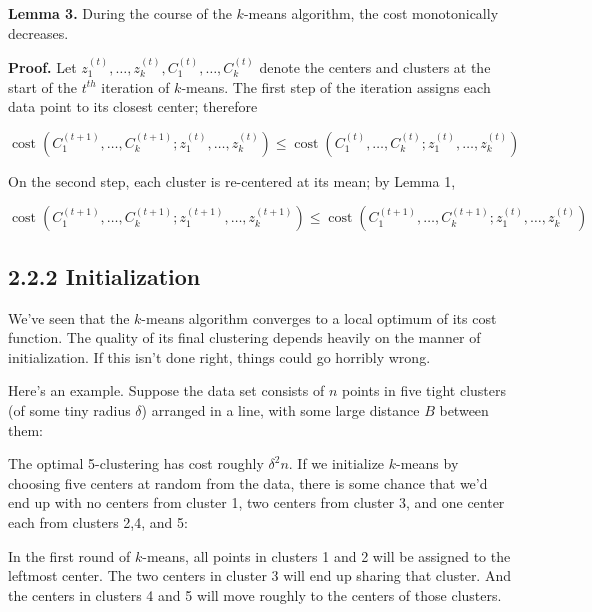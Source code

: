 \documentclass{article}
\begin{document}
\textbf{Lemma 3.} During the course of the $k$-means algorithm, the cost monotonically decreases.

\textbf{Proof.} Let $z_{1}^{(t)}, \ldots, z_{k}^{(t)}, C_{1}^{(t)}, \ldots, C_{k}^{(t)}$ denote the centers and clusters at the start of the $t^{t h}$ iteration of $k$-means. The first step of the iteration assigns each data point to its closest center; therefore

\begin{equation*}
\operatorname{cost}\left(C_{1}^{(t+1)}, \ldots, C_{k}^{(t+1)} ; z_{1}^{(t)}, \ldots, z_{k}^{(t)}\right) \leq \operatorname{cost}\left(C_{1}^{(t)}, \ldots, C_{k}^{(t)} ; z_{1}^{(t)}, \ldots, z_{k}^{(t)}\right)
\end{equation*}

On the second step, each cluster is re-centered at its mean; by Lemma 1,

\begin{equation*}
\operatorname{cost}\left(C_{1}^{(t+1)}, \ldots, C_{k}^{(t+1)} ; z_{1}^{(t+1)}, \ldots, z_{k}^{(t+1)}\right) \leq \operatorname{cost}\left(C_{1}^{(t+1)}, \ldots, C_{k}^{(t+1)} ; z_{1}^{(t)}, \ldots, z_{k}^{(t)}\right)
\end{equation*}

\subsection*{2.2.2 Initialization}

We've seen that the $k$-means algorithm converges to a local optimum of its cost function. The quality of its final clustering depends heavily on the manner of initialization. If this isn't done right, things could go horribly wrong.

Here's an example. Suppose the data set consists of $n$ points in five tight clusters (of some tiny radius $\delta$) arranged in a line, with some large distance $B$ between them:

The optimal 5-clustering has cost roughly $\delta^{2} n$. If we initialize $k$-means by choosing five centers at random from the data, there is some chance that we'd end up with no centers from cluster 1, two centers from cluster 3, and one center each from clusters 2,4, and 5:

In the first round of $k$-means, all points in clusters 1 and 2 will be assigned to the leftmost center. The two centers in cluster 3 will end up sharing that cluster. And the centers in clusters 4 and 5 will move roughly to the centers of those clusters.
\end{document}
